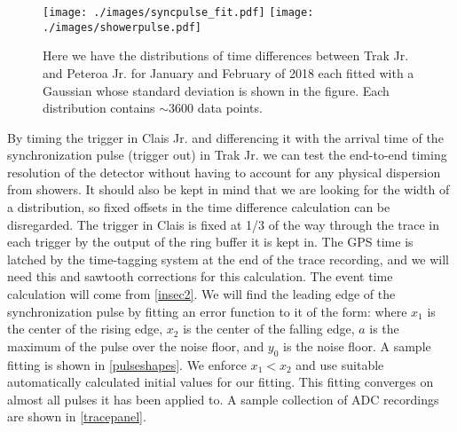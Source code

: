 \begin{figure}[H]
\centering
\texttt{[image: ./images/syncpulse\_fit.pdf]}
\texttt{[image: ./images/showerpulse.pdf]}
\caption[Distribution of Distances-to-Detector]{Here we have the distributions of time differences between Trak Jr. and Peteroa Jr. for January and February of 2018 each fitted with a Gaussian whose standard deviation is shown in the figure. Each distribution contains $\sim$3600 data points.}
\label{pulseshapes}
\end{figure}

By timing the trigger in Clais Jr. and differencing it with the arrival time of the synchronization pulse (trigger out) in Trak Jr. we can test the end-to-end timing resolution of the detector without having to account for any physical dispersion from showers. It should also be kept in mind that we are looking for the width of a distribution, so fixed offsets in the time difference calculation can be disregarded. The trigger in Clais is fixed at 1/3 of the way through the trace in each trigger by the output of the ring buffer it is kept in. The GPS time is latched by the time-tagging system at the end of the trace recording, and we will need this and sawtooth corrections for this calculation. The event time calculation will come from \autoref{insec2}. We will find the leading edge of the synchronization pulse by fitting an error function to it of the form:
where $x_1$ is the center of the rising edge, $x_2$ is the center of the falling edge, $a$ is the maximum of the pulse over the noise floor, and $y_0$ is the noise floor. A sample fitting is shown in \autoref{pulseshapes}. We enforce $x_1<x_2$ and use suitable automatically calculated initial values for our fitting. This fitting converges on almost all pulses it has been applied to. A sample collection of ADC recordings are shown in \autoref{tracepanel}.


